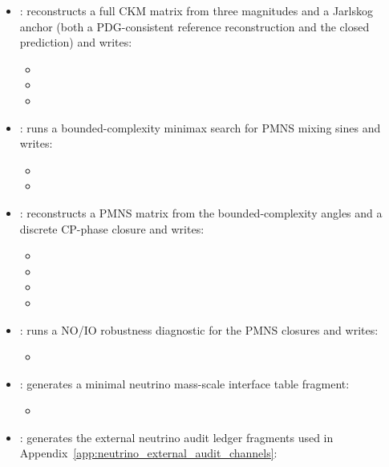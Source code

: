 \begin{sloppypar}
\begin{itemize}
\item {}: reconstructs a full CKM matrix from three magnitudes and a Jarlskog anchor (both a PDG-consistent reference reconstruction and the closed prediction) and writes:
\begin{itemize}
\item {}
\item {}
\item {}
\end{itemize}
\item {}: runs a bounded-complexity minimax search for PMNS mixing sines and writes:
\begin{itemize}
\item {}
\item {}
\end{itemize}
\item {}: reconstructs a PMNS matrix from the bounded-complexity angles and a discrete CP-phase closure and writes:
\begin{itemize}
\item {}
\item {}
\item {}
\item {}
\end{itemize}
\item {}: runs a NO/IO robustness diagnostic for the PMNS closures and writes:
\begin{itemize}
\item {}
\end{itemize}
\item {}: generates a minimal neutrino mass-scale interface table fragment:
\begin{itemize}
\item {}
\end{itemize}
\item {}: generates the external neutrino audit ledger fragments used in Appendix~\ref{app:neutrino_external_audit_channels}:

\end{itemize}
\end{sloppypar}
